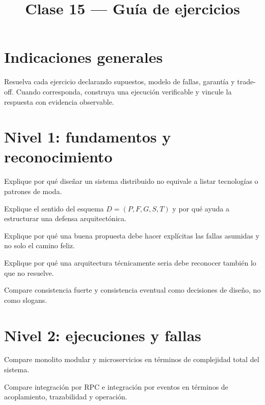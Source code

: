 \documentclass[variant=guia,cover=institutional,mode=screen]{ua-engineering-v6-article}
\title{Clase 15 --- Guía de ejercicios}
\author{\UAProfessor}
\date{\UADate}
\begin{document}
\section{Indicaciones generales}
Resuelva cada ejercicio declarando supuestos, modelo de fallas, garantía y trade-off. Cuando corresponda, construya una ejecución verificable y vincule la respuesta con evidencia observable.

\section{Nivel 1: fundamentos y reconocimiento}
\begin{uaexercise}
Explique por qué diseñar un sistema distribuido no equivale a listar tecnologías o patrones de moda.
\end{uaexercise}

\begin{uaexercise}
Explique el sentido del esquema $D=(P,F,G,S,T)$ y por qué ayuda a estructurar una defensa arquitectónica.
\end{uaexercise}

\begin{uaexercise}
Explique por qué una buena propuesta debe hacer explícitas las fallas asumidas y no solo el camino feliz.
\end{uaexercise}

\begin{uaexercise}
Explique por qué una arquitectura técnicamente seria debe reconocer también lo que no resuelve.
\end{uaexercise}

\begin{uaexercise}
Compare consistencia fuerte y consistencia eventual como decisiones de diseño, no como slogans.
\end{uaexercise}


\section{Nivel 2: ejecuciones y fallas}
\begin{uaexercise}
Compare monolito modular y microservicios en términos de complejidad total del sistema.
\end{uaexercise}

\begin{uaexercise}
Compare integración por RPC e integración por eventos en términos de acoplamiento, trazabilidad y operación.
\end{uaexercise}
\end{document}
